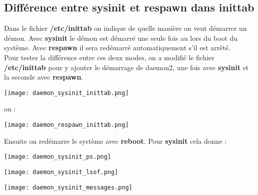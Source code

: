 \subsection{Différence entre sysinit et respawn dans inittab}

Dans le fichier \textbf{/etc/inittab} on indique de quelle manière on veut démarrer un démon. Avec \textbf{sysinit} le démon est démarré une seule fois au lors du boot du système. Avec \textbf{respawn} il sera redémarré automatiquement s'il est arrêté.\\

Pour tester la différence entre ces deux modes, on a modifié le fichier \textbf{/etc/inittab} pour y ajouter le démarrage de daemon2, une fois avec \textbf{sysinit} et la seconde avec \textbf{respawn}.\\

\begin{center} 
\hspace{15cm}
\texttt{[image: daemon\_sysinit\_inittab.png]}
\end{center}
\vspace{0.5cm}

ou :

\begin{center} 
\hspace{15cm}
\texttt{[image: daemon\_respawn\_inittab.png]}
\end{center}
\vspace{0.5cm}

Ensuite on redémarre le système avec \textbf{reboot}. Pour \textbf{sysinit} cela donne :

\begin{center} 
\hspace{15cm}
\texttt{[image: daemon\_sysinit\_ps.png]}
\end{center}
\vspace{0.5cm}

\begin{center} 
\hspace{15cm}
\texttt{[image: daemon\_sysinit\_lsof.png]}
\end{center}
\vspace{0.5cm}

\begin{center} 
\hspace{15cm}
\texttt{[image: daemon\_sysinit\_messages.png]}
\end{center}
\vspace{0.5cm}

